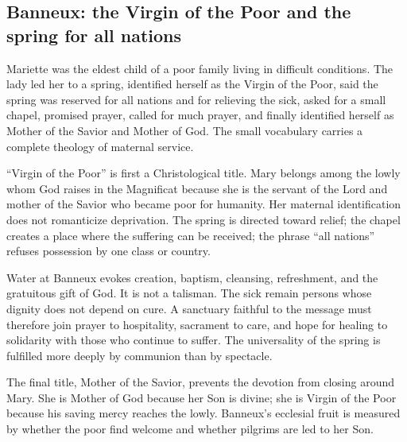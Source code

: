 \subsection{Banneux: the Virgin of the Poor and the spring for all nations}


Mariette was the eldest child of a poor family living in difficult conditions. The lady led her to a spring, identified herself as the Virgin of the Poor, said the spring was reserved for all nations and for relieving the sick, asked for a small chapel, promised prayer, called for much prayer, and finally identified herself as Mother of the Savior and Mother of God. The small vocabulary carries a complete theology of maternal service.

``Virgin of the Poor'' is first a Christological title. Mary belongs among the lowly whom God raises in the Magnificat because she is the servant of the Lord and mother of the Savior who became poor for humanity. Her maternal identification does not romanticize deprivation. The spring is directed toward relief; the chapel creates a place where the suffering can be received; the phrase ``all nations'' refuses possession by one class or country.

Water at Banneux evokes creation, baptism, cleansing, refreshment, and the gratuitous gift of God. It is not a talisman. The sick remain persons whose dignity does not depend on cure. A sanctuary faithful to the message must therefore join prayer to hospitality, sacrament to care, and hope for healing to solidarity with those who continue to suffer. The universality of the spring is fulfilled more deeply by communion than by spectacle.

The final title, Mother of the Savior, prevents the devotion from closing around Mary. She is Mother of God because her Son is divine; she is Virgin of the Poor because his saving mercy reaches the lowly. Banneux's ecclesial fruit is measured by whether the poor find welcome and whether pilgrims are led to her Son.

